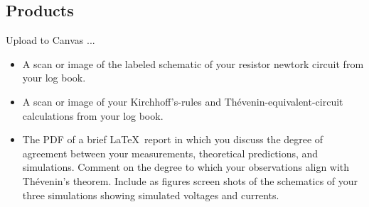 \documentclass[11pt]{article}
\begin{document}
\subsection*{Products}

Upload to Canvas ...

\begin{itemize}
\item A scan or image of the labeled schematic of your resistor
  newtork circuit from your log book.

\item A scan or image of your Kirchhoff's-rules and
  Th\'{e}venin-equivalent-circuit calculations from your log book.

\item The PDF of a brief \LaTeX\ report in which you discuss the
  degree of agreement between your measurements, theoretical
  predictions, and simulations. Comment on the degree to which your
  observations align with Th\'{e}venin's theorem. Include as figures
  screen shots of the schematics of your three simulations showing 
  simulated voltages and currents.
\end{itemize}
\end{document}
